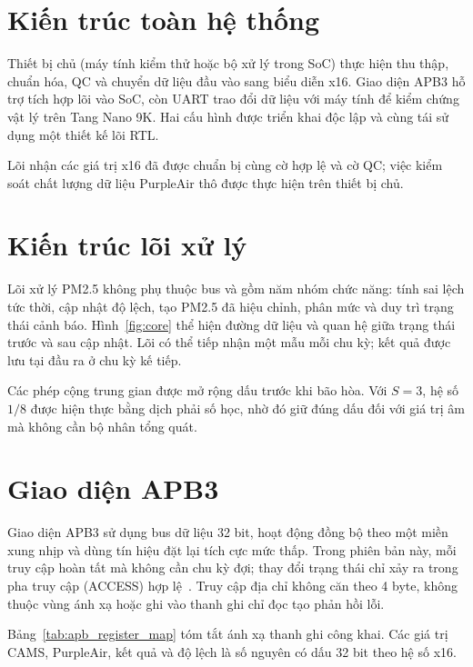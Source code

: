 \documentclass[a4paper,oneside,openany]{extreport}
\begin{document}
\section{Kiến trúc toàn hệ thống}
Thiết bị chủ (máy tính kiểm thử hoặc bộ xử lý trong SoC) thực hiện thu thập, chuẩn hóa, QC và chuyển dữ liệu đầu vào sang biểu diễn x16. Giao diện APB3 hỗ trợ tích hợp lõi vào SoC, còn UART trao đổi dữ liệu với máy tính để kiểm chứng vật lý trên Tang Nano 9K. Hai cấu hình được triển khai độc lập và cùng tái sử dụng một thiết kế lõi RTL.


Lõi nhận các giá trị x16 đã được chuẩn bị cùng cờ hợp lệ và cờ QC; việc kiểm soát chất lượng dữ liệu PurpleAir thô được thực hiện trên thiết bị chủ.

\section{Kiến trúc lõi xử lý}
Lõi xử lý PM2.5 không phụ thuộc bus và gồm năm nhóm chức năng: tính sai lệch tức thời, cập nhật độ lệch, tạo PM2.5 đã hiệu chỉnh, phân mức và duy trì trạng thái cảnh báo. Hình~\ref{fig:core} thể hiện đường dữ liệu và quan hệ giữa trạng thái trước và sau cập nhật. Lõi có thể tiếp nhận một mẫu mỗi chu kỳ; kết quả được lưu tại đầu ra ở chu kỳ kế tiếp.


Các phép cộng trung gian được mở rộng dấu trước khi bão hòa. Với $S=3$, hệ số $1/8$ được hiện thực bằng dịch phải số học, nhờ đó giữ đúng dấu đối với giá trị âm mà không cần bộ nhân tổng quát.

\section{Giao diện APB3}
Giao diện APB3 sử dụng bus dữ liệu 32 bit, hoạt động đồng bộ theo một miền xung nhịp và dùng tín hiệu đặt lại tích cực mức thấp. Trong phiên bản này, mỗi truy cập hoàn tất mà không cần chu kỳ đợi; thay đổi trạng thái chỉ xảy ra trong pha truy cập (ACCESS) hợp lệ~\cite{arm_apb3}. Truy cập địa chỉ không căn theo 4 byte, không thuộc vùng ánh xạ hoặc ghi vào thanh ghi chỉ đọc tạo phản hồi lỗi.

Bảng~\ref{tab:apb_register_map} tóm tắt ánh xạ thanh ghi công khai. Các giá trị CAMS, PurpleAir, kết quả và độ lệch là số nguyên có dấu 32 bit theo hệ số x16.
\end{document}
